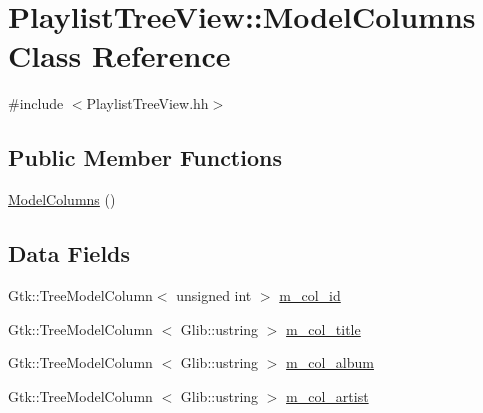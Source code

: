 \hypertarget{classPlaylistTreeView_1_1ModelColumns}{
\section{\-Playlist\-Tree\-View\-:\-:\-Model\-Columns \-Class \-Reference}
\label{classPlaylistTreeView_1_1ModelColumns}
}


{\ttfamily \#include $<$\-Playlist\-Tree\-View.\-hh$>$}

\subsection*{\-Public \-Member \-Functions}
\begin{DoxyCompactItemize}
\item 
\hyperlink{classPlaylistTreeView_1_1ModelColumns_ae682bbad1999435b2fbb10d6932d98c1}{\-Model\-Columns} ()
\end{DoxyCompactItemize}
\subsection*{\-Data \-Fields}
\begin{DoxyCompactItemize}
\item 
\-Gtk\-::\-Tree\-Model\-Column$<$ unsigned \*
int $>$ \hyperlink{classPlaylistTreeView_1_1ModelColumns_a2a028154e2fcebde436851e4ede174ce}{m\-\_\-col\-\_\-id}
\item 
\-Gtk\-::\-Tree\-Model\-Column\*
$<$ \-Glib\-::ustring $>$ \hyperlink{classPlaylistTreeView_1_1ModelColumns_ad4172e033be4ef6b2e47a8323601cee9}{m\-\_\-col\-\_\-title}
\item 
\-Gtk\-::\-Tree\-Model\-Column\*
$<$ \-Glib\-::ustring $>$ \hyperlink{classPlaylistTreeView_1_1ModelColumns_a3b424ec7dd9635d68bc4008aff7e22e1}{m\-\_\-col\-\_\-album}
\item 
\-Gtk\-::\-Tree\-Model\-Column\*
$<$ \-Glib\-::ustring $>$ \hyperlink{classPlaylistTreeView_1_1ModelColumns_a3c51d1d3b9aa4da11ebba3ce77207edb}{m\-\_\-col\-\_\-artist}
\end{DoxyCompactItemize}


